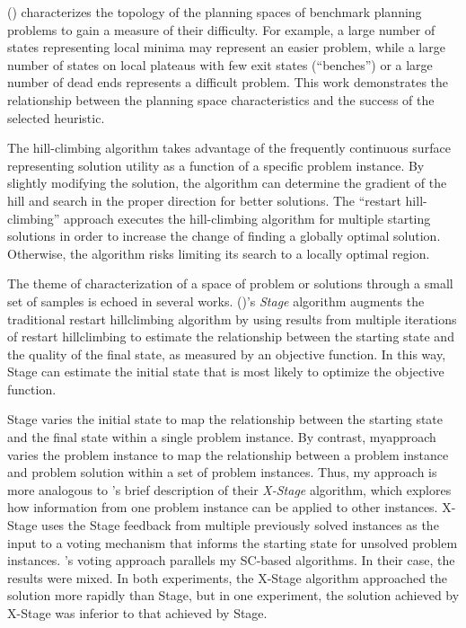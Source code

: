 \citeauthor{hoffmann01local} (\citeyear{hoffmann01local})  characterizes the topology of the planning spaces of benchmark planning problems to gain a  measure of their difficulty.  For example, a large number of states representing local minima may represent an easier problem, while a large number of states on local plateaus with few exit states (``benches'') or a large number of dead ends represents a difficult problem.   This work demonstrates the relationship between the planning space characteristics and the success of the selected heuristic.


The hill-climbing algorithm takes advantage of the frequently continuous surface representing solution utility as a function of a specific problem instance.  By slightly modifying the solution, the algorithm can determine the gradient of the hill and search in the proper direction for better solutions.  The ``restart hill-climbing'' approach executes the hill-climbing algorithm for multiple starting solutions in order to increase the change of finding a globally optimal solution.  Otherwise, the algorithm risks limiting its search to a locally optimal region.


The theme of characterization of a space of problem or solutions through a small set of samples is echoed in several works.  \citeauthor{boyan00learning} (\citeyear{boyan00learning})'s \textit{Stage} algorithm augments the traditional restart hillclimbing algorithm by using results from multiple iterations of restart hillclimbing to estimate the relationship between the starting state and the quality of the final state, as measured by an objective function.  In this way, Stage can estimate the initial state that is most likely to optimize the objective function.  



Stage varies the initial state to map the relationship between the starting state and the final state within a single problem instance.  By contrast, myapproach varies the problem instance to map the relationship between a problem instance and problem solution within a set of problem instances.  Thus, my approach is more analogous to \citeauthor{boyan00learning}'s brief description of their \textit{X-Stage} algorithm, which explores how information from one problem instance can be applied to other instances.  X-Stage uses the Stage feedback from multiple previously solved instances as the input to a voting mechanism that informs the starting state for unsolved problem instances.  \citeauthor{boyan00learning}'s voting approach parallels my SC-based algorithms.  In their case, the results were mixed.  In both experiments, the X-Stage algorithm approached the solution more rapidly than Stage, but in one experiment, the solution achieved by X-Stage was inferior to that achieved by Stage.

